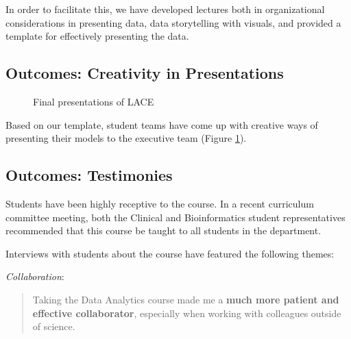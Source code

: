 In order to facilitate this, we have developed lectures both in
organizational considerations in presenting data, data storytelling with
visuals, and provided a template for effectively presenting the data.

\hypertarget{outcomes-creativity-in-presentations}{%
\subsection{Outcomes: Creativity in
Presentations}\label{outcomes-creativity-in-presentations}}

\begin{Schunk}
\begin{figure}

{\centering {}\newline{}

}

\caption[Final presentations of LACE]{Final presentations of LACE}\label{fig:presentations}
\end{figure}
\end{Schunk}

Based on our template, student teams have come up with creative ways of
presenting their models to the executive team (Figure
\ref{fig:presentations}).

\hypertarget{outcomes-testimonies}{%
\subsection{Outcomes: Testimonies}\label{outcomes-testimonies}}

Students have been highly receptive to the course. In a recent
curriculum committee meeting, both the Clinical and Bioinformatics
student representatives recommended that this course be taught to all
students in the department.

Interviews with students about the course have featured the following
themes:

\emph{Collaboration}:

\begin{quote}
Taking the Data Analytics course made me a \textbf{much more patient and
effective collaborator}, especially when working with colleagues outside
of science.
\end{quote}

